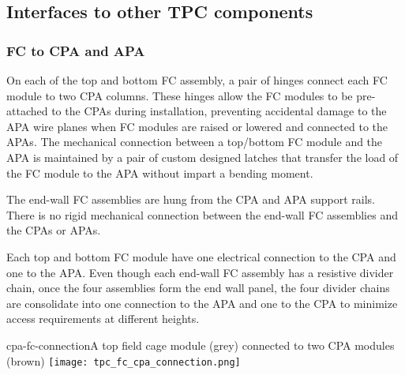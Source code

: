 
\subsection{Interfaces to other TPC components}

\subsubsection{FC to CPA and APA}

On each of the top and bottom FC assembly, a pair of hinges connect each FC module to two CPA columns. These hinges allow the FC modules to be pre-attached to the CPAs during installation, preventing accidental damage to the APA wire planes when FC modules are raised or lowered and connected to the APAs.  The mechanical connection between a top/bottom FC module and the APA is maintained by a pair of custom designed latches that transfer the load of the FC module to the APA without impart a bending moment.

The end-wall FC assemblies are hung from the CPA and APA support rails.  There is no rigid mechanical connection 
between the end-wall FC assemblies and the CPAs or APAs. 

Each top and bottom FC module have one electrical connection to the CPA and one to the APA. Even though each end-wall FC assembly has a resistive divider chain, once the four assemblies form the end wall panel, the four divider chains are consolidate into one connection to the APA and one to the CPA to minimize access requirements at different heights. 

\begin{cdrfigure}{cpa-fc-connection}{A top field cage module (grey) connected to two CPA modules (brown)}
\texttt{[image: tpc\_fc\_cpa\_connection.png]}
\end{cdrfigure}

